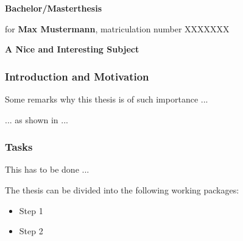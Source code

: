 \documentclass[10pt]{article}
\begin{document}

\begin{center}{
\textbf{Bachelor/Masterthesis}    

for {\bf Max Mustermann}, matriculation number XXXXXXX

\vspace{1ex}
\textbf{\large A  Nice and Interesting Subject}
}\end{center}


\subsubsection*{Introduction and Motivation}

Some remarks why this thesis is of such importance ...

... as shown in \cite{HaddadinKriAlbLil2018} ...


\subsubsection*{Tasks}

This has to be done ...

The thesis can be divided into the following working packages:

\begin{itemize}\itemsep0ex

\item Step 1

\item Step 2

\end{itemize}

\AtNextBibliography{\footnotesize\itemsep0ex}
\printbibliography
\end{document}
